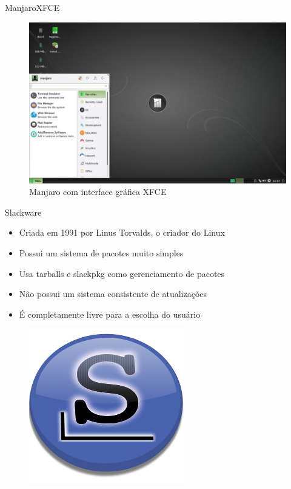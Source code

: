 \documentclass{beamer}
\begin{document}
\begin{frame}{Manjaro}{XFCE}
 \begin{figure}[h!]
        \centering
        \includegraphics[scale=0.27]{manjaroXFCE.jpg}
        \caption{Manjaro com interface gráfica XFCE}
        \label{fig:Comando ls}
    \end{figure}
\end{frame}

\begin{frame}{Slackware}
    \begin{itemize}
        \item{Criada em 1991 por Linus Torvalds, o criador do Linux}
        \item{Possui um sistema de pacotes muito simples}
        \item{Usa tarballs e slackpkg como gerenciamento de pacotes}
        \item{Não possui um sistema consistente de atualizações}
        \item{É completamente livre para a escolha do usuário}
    \end{itemize}
    \begin{figure}[h!]
        \centering
        \includegraphics[scale=0.20]{slackware.png}
    \end{figure}
\end{frame}
\end{document}
